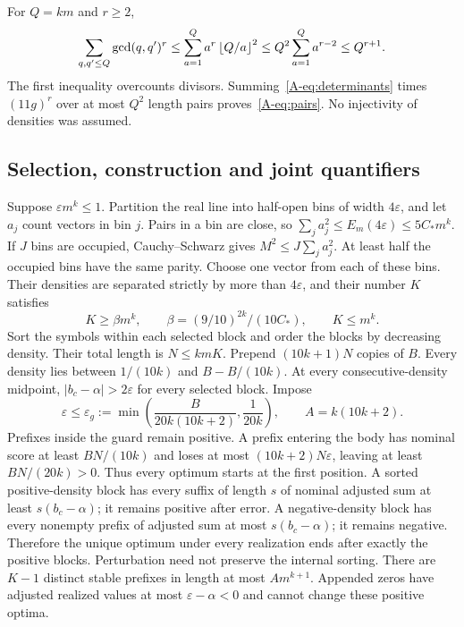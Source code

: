 For $Q=km$ and $r\ge2$,
\begin{equation}\label{A-eq:gcd}
\sum_{q,q'\le Q}\gcd(q,q')^r
\le\sum_{a=1}^Q a^r\left\lfloor Q/a\right\rfloor^2
\le Q^2\sum_{a=1}^Q a^{r-2}\le Q^{r+1}.
\end{equation}
The first inequality overcounts divisors. Summing~\eqref{A-eq:determinants} times $(11g)^r$ over at most $Q^2$ length pairs proves~\eqref{A-eq:pairs}. No injectivity of densities was assumed.

\subsection{Selection, construction and joint quantifiers}
Suppose $\varepsilon m^k\le1$. Partition the real line into half-open bins of width $4\varepsilon$, and let $a_j$ count vectors in bin $j$. Pairs in a bin are close, so $\sum_j a_j^2\le E_m(4\varepsilon)\le5C_*m^k$. If $J$ bins are occupied, Cauchy--Schwarz gives $M^2\le J\sum_j a_j^2$. At least half the occupied bins have the same parity. Choose one vector from each of these bins. Their densities are separated strictly by more than $4\varepsilon$, and their number $K$ satisfies
\begin{equation}\label{A-eq:selection}
K\ge\beta m^k,\qquad \beta=(9/10)^{2k}/(10C_*),\qquad K\le m^k.
\end{equation}
Sort the symbols within each selected block and order the blocks by decreasing density. Their total length is $N\le kmK$. Prepend $(10k+1)N$ copies of $B$. Every density lies between $1/(10k)$ and $B-B/(10k)$. At every consecutive-density midpoint, $|b_c-\alpha|>2\varepsilon$ for every selected block. Impose
\begin{equation}\label{A-eq:guard}
\varepsilon\le\varepsilon_g:=\min\left(\frac{B}{20k(10k+2)},\frac1{20k}\right),
\qquad A=k(10k+2).
\end{equation}
Prefixes inside the guard remain positive. A prefix entering the body has nominal score at least $BN/(10k)$ and loses at most $(10k+2)N\varepsilon$, leaving at least $BN/(20k)>0$. Thus every optimum starts at the first position. A sorted positive-density block has every suffix of length $s$ of nominal adjusted sum at least $s(b_c-\alpha)$; it remains positive after error. A negative-density block has every nonempty prefix of adjusted sum at most $s(b_c-\alpha)$; it remains negative. Therefore the unique optimum under every realization ends after exactly the positive blocks. Perturbation need not preserve the internal sorting. There are $K-1$ distinct stable prefixes in length at most $A m^{k+1}$. Appended zeros have adjusted realized values at most $\varepsilon-\alpha<0$ and cannot change these positive optima.

